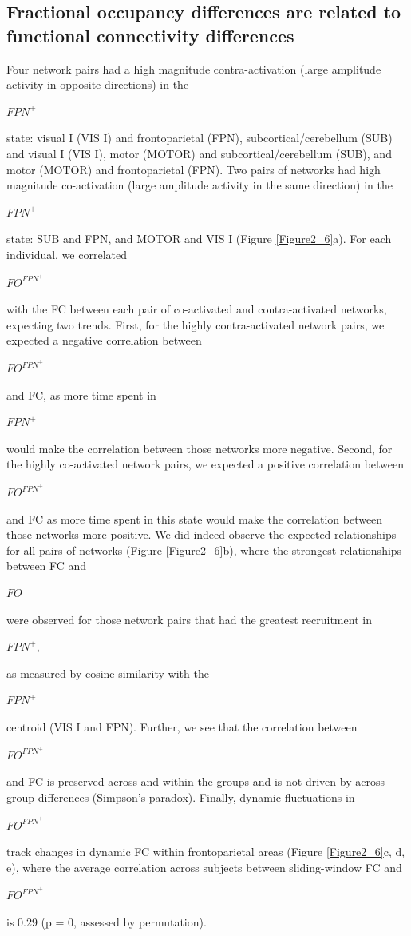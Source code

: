 \documentclass[phd,tocprelim]{cornell}
\begin{document}
    \subsection{Fractional occupancy differences are related to functional connectivity differences}
    Four network pairs had a high magnitude contra-activation (large amplitude activity in opposite directions) in the \begin{Large}$FPN^+$\end{Large} state: visual I (VIS I) and frontoparietal (FPN), subcortical/cerebellum (SUB) and visual I (VIS I), motor (MOTOR) and subcortical/cerebellum (SUB), and motor (MOTOR) and frontoparietal (FPN). Two pairs of networks had high magnitude co-activation (large amplitude activity in the same direction) in the \begin{Large}$FPN^+$\end{Large} state: SUB and FPN, and MOTOR and VIS I (Figure \ref{Figure2_6}a). For each individual, we correlated \begin{Large}$FO^{FPN^+}$\end{Large} with the FC between each pair of co-activated and contra-activated networks, expecting two trends. First, for the highly contra-activated network pairs, we expected a negative correlation between \begin{Large}$FO^{FPN^+}$\end{Large} and FC, as more time spent in \begin{Large}$FPN^+$\end{Large} would make the correlation between those networks more negative. Second, for the highly co-activated network pairs, we expected a positive correlation between \begin{Large}$FO^{FPN^+}$\end{Large} and FC as more time spent in this state would make the correlation between those networks more positive. We did indeed observe the expected relationships for all pairs of networks (Figure \ref{Figure2_6}b), where the strongest relationships between FC and \begin{Large}$FO$\end{Large} were observed for those network pairs that had the greatest recruitment in \begin{Large}$FPN^+$,\end{Large} as measured by cosine similarity with the \begin{Large}$FPN^+$\end{Large} centroid (VIS I and FPN). Further, we see that the correlation between \begin{Large}$FO^{FPN^+}$\end{Large} and FC is preserved across and within the groups and is not driven by across-group differences (Simpson's paradox).
    Finally, dynamic fluctuations in  \begin{Large}$FO^{FPN^+}$ \end{Large} track changes in dynamic FC within frontoparietal areas (Figure \ref{Figure2_6}c, d, e), where the average correlation across subjects between sliding-window FC and  \begin{Large}$FO^{FPN^+}$ \end{Large} is 0.29 (p = 0, assessed by permutation).
\end{document}
